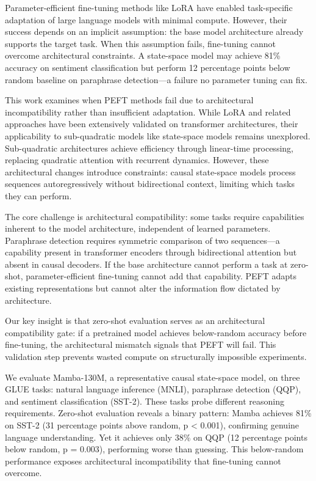 
Parameter-efficient fine-tuning methods like LoRA have enabled task-specific adaptation of large language models with minimal compute. However, their success depends on an implicit assumption: the base model architecture already supports the target task. When this assumption fails, fine-tuning cannot overcome architectural constraints. A state-space model may achieve 81\% accuracy on sentiment classification but perform 12 percentage points below random baseline on paraphrase detection---a failure no parameter tuning can fix.

This work examines when PEFT methods fail due to architectural incompatibility rather than insufficient adaptation. While LoRA and related approaches have been extensively validated on transformer architectures, their applicability to sub-quadratic models like state-space models remains unexplored. Sub-quadratic architectures achieve efficiency through linear-time processing, replacing quadratic attention with recurrent dynamics. However, these architectural changes introduce constraints: causal state-space models process sequences autoregressively without bidirectional context, limiting which tasks they can perform.

The core challenge is architectural compatibility: some tasks require capabilities inherent to the model architecture, independent of learned parameters. Paraphrase detection requires symmetric comparison of two sequences---a capability present in transformer encoders through bidirectional attention but absent in causal decoders. If the base architecture cannot perform a task at zero-shot, parameter-efficient fine-tuning cannot add that capability. PEFT adapts existing representations but cannot alter the information flow dictated by architecture.

Our key insight is that zero-shot evaluation serves as an architectural compatibility gate: if a pretrained model achieves below-random accuracy before fine-tuning, the architectural mismatch signals that PEFT will fail. This validation step prevents wasted compute on structurally impossible experiments.

We evaluate Mamba-130M, a representative causal state-space model, on three GLUE tasks: natural language inference (MNLI), paraphrase detection (QQP), and sentiment classification (SST-2). These tasks probe different reasoning requirements. Zero-shot evaluation reveals a binary pattern: Mamba achieves 81\% on SST-2 (31 percentage points above random, p < 0.001), confirming genuine language understanding. Yet it achieves only 38\% on QQP (12 percentage points below random, p = 0.003), performing worse than guessing. This below-random performance exposes architectural incompatibility that fine-tuning cannot overcome.

